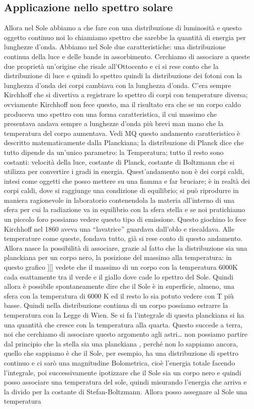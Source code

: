 \documentclass[a4paper,11pt]{article}
\begin{document}
\subsection{Applicazione nello spettro solare}
Allora nel Sole abbiamo a che fare con una distribuzione di luminosità e questo oggetto continuo noi lo chiamiamo spettro che sarebbe la quantità di energia per lunghezze d’onda. Abbiamo nel Sole due caratteristiche: una distribuzione continua della luce e delle bande in assorbimento. Cerchiamo di associare a queste due proprietà un’origine che risale all’Ottocento e ci si rese conto che la distribuzione di luce e quindi lo spettro quindi la distribuzione dei fotoni con la lunghezza d’onda dei corpi cambiava con la lunghezza d’onda. C’era sempre Kirchhoff che si divertiva a registrare lo spettro di corpi con temperature diversa; ovviamente Kirchhoff non fece questo, ma il risultato era che se un corpo caldo produceva uno spettro con una forma caratteristica, il cui massimo che presentava andava sempre a lunghezze d’onda più brevi man mano che la temperatura del corpo aumentava. Vedi MQ questo andamento caratteristico è descritto matematicamente dalla Planckiana; la distribuzione di Planck dice che tutto dipende da un’unico parametro: la Temperatura; tutto il resto sono costanti: velocità della luce, costante di Planck, costante di Boltzmann che si utilizza per convertire i gradi in energia. Quest’andamento non è dei corpi caldi, intesi come oggetti che posso mettere su una fiamma e far bruciare; è in realtà dei corpi caldi, dove si raggiunge una condizione di equilibrio; si può riprodurre in maniera ragionevole in laboratorio contenendola la materia all’interno di una sfera per cui la radiazione va in equilibrio con la sfera stella e se noi pratichiamo un piccolo foro possiamo vedere questo tipo di emissione. Questo giochino lo fece Kirchhoff nel 1860 aveva una “lavatrice” guardava dall’oblo e riscaldava. Alle temperature come queste, fondava tutto, già si rese conto di questo andamento.  Allora nasce la possibilità di associare, grazie al fatto che la distribuzione sia una planckiana per un corpo nero, la posizione del massimo alla temperatura:  in questo grafico ][] vedete che il massimo di un corpo con la temperatura  6000K cada esattamente tra il verde e il giallo dove cade lo spettro del Sole. Quindi allora è possibile spontaneamente dire che il Sole è in superficie, almeno, una sfera con la temperatura di 6000 K ed il resto lo sia potuto vedere con T più basse. Quindi nella distribuzione continua di un corpo possiamo estrarre la temperatura con la Legge di Wien. Se si fa l’integrale di questa planckiana si ha una quantità che cresce con la temperatura alla quarta. Questo succede a terra, noi che cerchiamo di associare questo argomento agli astri… non possiamo partire dal principio che la stella sia una planckiana , perché non lo sappiamo ancora, quello che sappiamo è che il Sole, per esempio, ha una distribuzione di spettro continuo e ci sarò una magnitudine Bolometrica, cioè l’energia totale facendo l’integrale, poi successivamente ipotizzare che il Sole sia un corpo nero e quindi posso associare una temperatura del sole, quindi misurando l’energia che arriva e la divido per la costante di Stefan-Boltzmann. Allora posso assegnare al Sole una temperatura 
\end{document}
